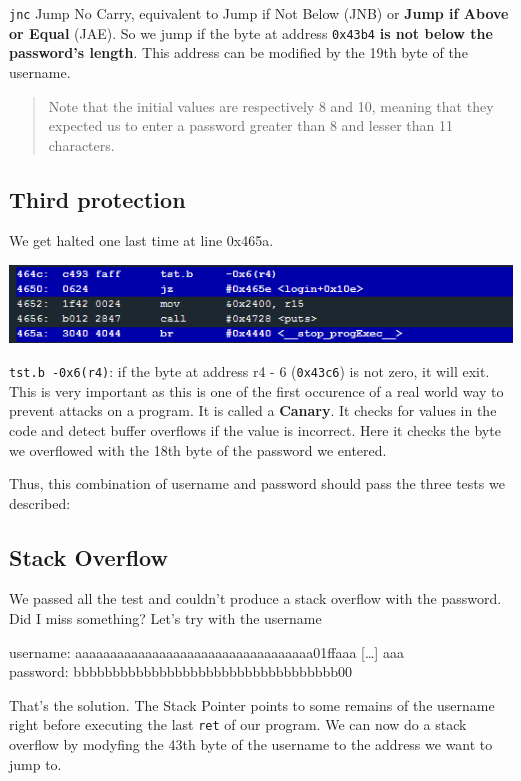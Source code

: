 \documentclass[a4paper,11pt]{article}
\begin{document}
\texttt{jnc} Jump No Carry, equivalent to Jump if Not Below (JNB) or
\textbf{Jump if Above or Equal} (JAE). So we jump if the byte at address
\texttt{0x43b4} \textbf{is not below the password's length}. This
address can be modified by the 19th byte of the username.

\begin{quote}
Note that the initial values are respectively 8 and 10, meaning that
they expected us to enter a password greater than 8 and lesser than 11
characters.
\end{quote}

\subsection{Third protection}\label{third-protection}

We get halted one last time at line 0x465a.

\includegraphics{img/10_4.PNG}

\texttt{tst.b -0x6(r4)}: if the byte at address r4 - 6 (\texttt{0x43c6})
is not zero, it will exit. This is very important as this is one of the
first occurence of a real world way to prevent attacks on a program. It
is called a \textbf{Canary}. It checks for values in the code and detect
buffer overflows if the value is incorrect. Here it checks the byte we
overflowed with the 18th byte of the password we entered.

Thus, this combination of username and password should pass the three
tests we described:

\subsection{Stack Overflow}\label{stack-overflow}

We passed all the test and couldn't produce a stack overflow with the
password. Did I miss something? Let's try with the username

username: aaaaaaaaaaaaaaaaaaaaaaaaaaaaaaaaaa01ffaaa {[}\ldots{}{]}
aaa\\password: bbbbbbbbbbbbbbbbbbbbbbbbbbbbbbbbbb00

That's the solution. The Stack Pointer points to some remains of the
username right before executing the last \texttt{ret} of our program. We
can now do a stack overflow by modyfing the 43th byte of the username to
the address we want to jump to.
\end{document}
